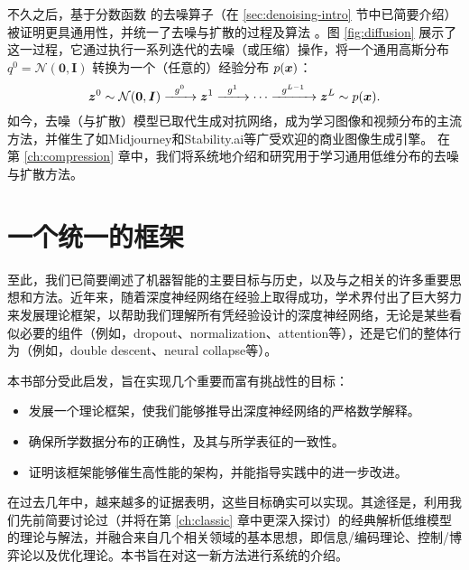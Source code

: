 \documentclass[../../book-main.tex]{subfiles}
\begin{document}
不久之后，基于分数函数 \cite{hyvarinen05a} 的去噪算子（在 \ref{sec:denoising-intro} 节中已简要介绍）被证明更具通用性，并统一了去噪与扩散的过程及算法 \cite{song2019,song2020score,ho2020denoising}。图 \ref{fig:diffusion} 展示了这一过程，它通过执行一系列迭代的去噪（或压缩）操作，将一个通用高斯分布 $q^0 = \mathcal{N}(\boldsymbol{0}, \boldsymbol{I})$ 转换为一个（任意的）经验分布 $p(\bm{x})$：
\begin{equation}
        \bm{z}^0 \sim  \mathcal{N}(\boldsymbol{0}, \boldsymbol{I})\xrightarrow{\hspace{2mm} g^0  \hspace{2mm}} \bm{z}^1 \xrightarrow{\hspace{2mm} g^1 \hspace{2mm}} \cdots \xrightarrow{\hspace{2mm} g^{L-1}  \hspace{2mm}} \bm{z}^L \sim p(\bm{x}).
\end{equation}
如今，去噪（与扩散）模型已取代生成对抗网络，成为学习图像和视频分布的主流方法，并催生了如Midjourney和Stability.ai等广受欢迎的商业图像生成引擎。
在第 \ref{ch:compression} 章中，我们将系统地介绍和研究用于学习通用低维分布的去噪与扩散方法。  



\section{一个统一的框架}\label{sec:unifying-approach}
至此，我们已简要阐述了机器智能的主要目标与历史，以及与之相关的许多重要思想和方法。近年来，随着深度神经网络在经验上取得成功，学术界付出了巨大努力来发展理论框架，以帮助我们理解所有凭经验设计的深度神经网络，无论是某些看似必要的组件（例如，dropout、normalization、attention等），还是它们的整体行为（例如，double descent、neural collapse等）。

本书部分受此启发，旨在实现几个重要而富有挑战性的目标：
\begin{itemize}
    \item 发展一个理论框架，使我们能够推导出深度神经网络的严格数学解释。
    \item 确保所学数据分布的正确性，及其与所学表征的一致性。
    \item 证明该框架能够催生高性能的架构，并能指导实践中的进一步改进。
\end{itemize}
在过去几年中，越来越多的证据表明，这些目标确实可以实现。其途径是，利用我们先前简要讨论过（并将在第 \ref{ch:classic} 章中更深入探讨）的经典解析低维模型的理论与解法，并融合来自几个相关领域的基本思想，即信息/编码理论、控制/博弈论以及优化理论。本书旨在对这一新方法进行系统的介绍。
\end{document}
